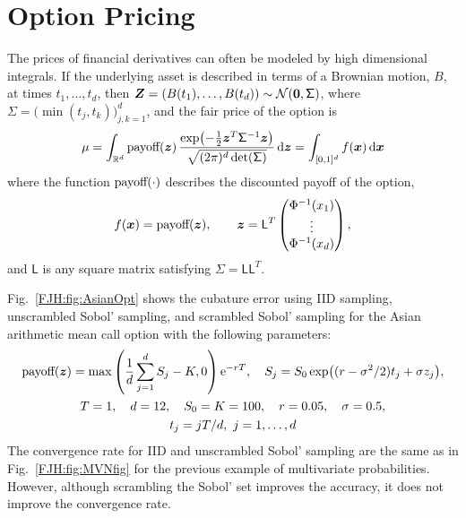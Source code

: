 \documentclass[graybox,footinfo]{svmult}
\begin{document}
\begin{FJHLesson} \label{FJH:eq:lessonfour}
	\FJHLessonFour
\end{FJHLesson}


\section{Option Pricing}
The prices of financial derivatives can often be modeled by high dimensional integrals.  If 
the underlying asset is described in terms of a Brownian motion, $B$, at times $t_1, 
\ldots, t_d$, then ${\boldsymbol{Z}} = (B(t_1), \ldots, B(t_d)) \sim \mathcal{N}({\boldsymbol{0}}, \mathsf{\Sigma})$, 
where $\mathsf{\Sigma}  = \bigl( \min(t_j,t_k) \bigr)_{j,k=1}^d$, and the fair price of the 
option is
\begin{equation*}
\mu = \int_{{\mathbb{R}}^d} \textup{payoff}({\boldsymbol{z}}) \, \frac{\exp\bigl(- \frac 12 {\boldsymbol{z}}^T 
\mathsf{\Sigma}^{-1} 
{\boldsymbol{z}} 
\bigr)}{\sqrt{(2 \pi)^d \det(\mathsf{\Sigma})}} \, \mathrm{d} {\boldsymbol{z}} = \int_{[0,1]^{d}} f({\boldsymbol{x}}) \, \mathrm{d} {\boldsymbol{x}} 
\end{equation*}
where the function $\textup{payoff}(\cdot)$ describes the discounted payoff of the 
option, 
\begin{equation*}
f({\boldsymbol{x}}) = \textup{payoff}({\boldsymbol{z}}), \qquad {\boldsymbol{z}} = \mathsf{L}^T \begin{pmatrix}
\Phi^{-1}(x_1) \\ \vdots \\ \Phi^{-1}(x_d)
\end{pmatrix}, 
\end{equation*}
and $\mathsf{L}$ is any square matrix satisfying $\mathsf{\Sigma} = \mathsf{L} 
\mathsf{L}^T$.


Fig.\ \ref{FJH:fig:AsianOpt} shows the cubature error using IID sampling, unscrambled 
Sobol' sampling, and scrambled Sobol' sampling for the Asian arithmetic mean call option 
with the following parameters:
\begin{gather*}
\textup{payoff}({\boldsymbol{z}}) = \max \left( \frac 1d \sum_{j=1}^d S_j - K, 0\right)\mathrm{e}^{-rT}, \quad
S_j = S_0 \exp\bigl( (r - \sigma^2/2) t_j + \sigma z_j\bigr),
\\
T = 1, \quad d = 12, \quad S_0 = K = 100, \quad r =  0.05, \quad \sigma = 0.5, \\
t_j = jT/d, \ j = 1, \ldots, d
\end{gather*}
The convergence rate for IID and unscrambled Sobol' sampling are the same as in Fig.\ 
\ref{FJH:fig:MVNfig} for the previous example of multivariate probabilities.  However, 
although scrambling the Sobol' set improves the accuracy, it does not improve the 
convergence rate. 
\end{document}

